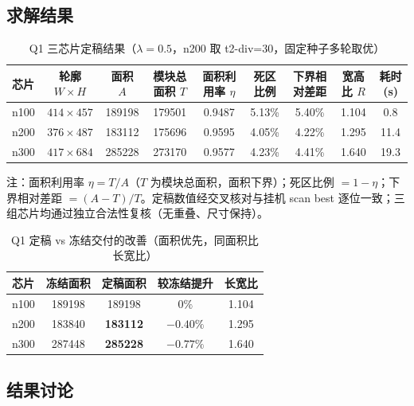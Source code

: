 \documentclass[12pt,a4paper]{article}
\begin{document}
\subsection{求解结果}


\begin{table}[H]
\centering
\caption{Q1 三芯片定稿结果（$\lambda = 0.5$，n200 取 t2-div=30，固定种子多轮取优）}
\footnotesize
\setlength{\tabcolsep}{2.5pt}
\begin{tabular}{lcccccccc}
\toprule
芯片 & 轮廓 $W \times H$ & 面积 $A$ & 模块总面积 $T$ & 面积利用率 $\eta$ & 死区比例 & 下界相对差距 & 宽高比 $R$ & 耗时(s) \\
\midrule
n100 & $414\times457$ & 189198 & 179501 & 0.9487 & 5.13\% & 5.40\% & 1.104 & 0.8 \\
n200 & $376\times487$ & 183112 & 175696 & 0.9595 & 4.05\% & 4.22\% & 1.295 & 11.4 \\
n300 & $417\times684$ & 285228 & 273170 & 0.9577 & 4.23\% & 4.41\% & 1.640 & 19.3 \\
\bottomrule
\end{tabular}
\end{table}

注：面积利用率 $\eta = T/A$（$T$ 为模块总面积，面积下界）；死区比例
$= 1 - \eta$；下界相对差距 $= (A - T)/T$。定稿数值经交叉核对与挂机
scan best 逐位一致；三组芯片均通过独立合法性复核（无重叠、尺寸保持）。

\begin{table}[H]
\centering
\small
\caption{Q1 定稿 vs 冻结交付的改善（面积优先，同面积比长宽比）}
\begin{tabular}{lcccc}
\toprule
芯片 & 冻结面积 & 定稿面积 & 较冻结提升 & 长宽比 \\
\midrule
n100 & 189198 & 189198 & $0\%$ & 1.104 \\
n200 & 183840 & \textbf{183112} & $-0.40\%$ & 1.295 \\
n300 & 287448 & \textbf{285228} & $-0.77\%$ & 1.640 \\
\bottomrule
\end{tabular}
\end{table}

\subsection{结果讨论}
\end{document}
